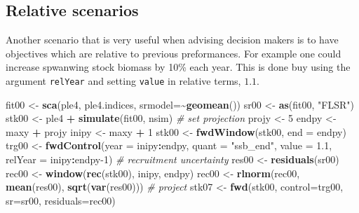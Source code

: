 \documentclass[
]{book}
\newenvironment{Shaded}{\begin{snugshade}}{\end{snugshade}}
\newcommand{\AttributeTok}[1]{\textcolor[rgb]{0.13,0.29,0.53}{#1}}
\newcommand{\CommentTok}[1]{\textcolor[rgb]{0.56,0.35,0.01}{\textit{#1}}}
\newcommand{\DecValTok}[1]{\textcolor[rgb]{0.00,0.00,0.81}{#1}}
\newcommand{\FloatTok}[1]{\textcolor[rgb]{0.00,0.00,0.81}{#1}}
\newcommand{\FunctionTok}[1]{\textcolor[rgb]{0.13,0.29,0.53}{\textbf{#1}}}
\newcommand{\NormalTok}[1]{#1}
\newcommand{\OtherTok}[1]{\textcolor[rgb]{0.56,0.35,0.01}{#1}}
\newcommand{\SpecialCharTok}[1]{\textcolor[rgb]{0.81,0.36,0.00}{\textbf{#1}}}
\newcommand{\StringTok}[1]{\textcolor[rgb]{0.31,0.60,0.02}{#1}}
\begin{document}
\hypertarget{relative-scenarios}{%
\subsection{Relative scenarios}\label{relative-scenarios}}

Another scenario that is very useful when advising decision makers is to have objectives which are relative to previous preformances. For example one could increase spwanwing stock biomass by 10\% each year. This is done buy using the argument \texttt{relYear} and setting \texttt{value} in relative terms, \(1.1\).

\begin{Shaded}
\begin{Highlighting}[]
\NormalTok{fit00 }\OtherTok{\textless{}{-}} \FunctionTok{sca}\NormalTok{(ple4, ple4.indices, }\AttributeTok{srmodel=}\SpecialCharTok{\textasciitilde{}}\FunctionTok{geomean}\NormalTok{())}
\NormalTok{sr00 }\OtherTok{\textless{}{-}} \FunctionTok{as}\NormalTok{(fit00, }\StringTok{"FLSR"}\NormalTok{)}
\NormalTok{stk00 }\OtherTok{\textless{}{-}}\NormalTok{ ple4 }\SpecialCharTok{+} \FunctionTok{simulate}\NormalTok{(fit00, nsim)}
\CommentTok{\# set projection}
\NormalTok{projy }\OtherTok{\textless{}{-}} \DecValTok{5}
\NormalTok{endpy }\OtherTok{\textless{}{-}}\NormalTok{ maxy }\SpecialCharTok{+}\NormalTok{ projy}
\NormalTok{inipy }\OtherTok{\textless{}{-}}\NormalTok{ maxy }\SpecialCharTok{+} \DecValTok{1}
\NormalTok{stk00 }\OtherTok{\textless{}{-}} \FunctionTok{fwdWindow}\NormalTok{(stk00, }\AttributeTok{end =}\NormalTok{ endpy)}
\NormalTok{trg00 }\OtherTok{\textless{}{-}} \FunctionTok{fwdControl}\NormalTok{(}\AttributeTok{year =}\NormalTok{ inipy}\SpecialCharTok{:}\NormalTok{endpy, }\AttributeTok{quant =} \StringTok{"ssb\_end"}\NormalTok{, }\AttributeTok{value =} \FloatTok{1.1}\NormalTok{, }\AttributeTok{relYear =}\NormalTok{ inipy}\SpecialCharTok{:}\NormalTok{endpy}\DecValTok{{-}1}\NormalTok{)}
\CommentTok{\# recruitment uncertainty}
\NormalTok{res00 }\OtherTok{\textless{}{-}} \FunctionTok{residuals}\NormalTok{(sr00)}
\NormalTok{rec00 }\OtherTok{\textless{}{-}} \FunctionTok{window}\NormalTok{(}\FunctionTok{rec}\NormalTok{(stk00), inipy, endpy)}
\NormalTok{rec00 }\OtherTok{\textless{}{-}} \FunctionTok{rlnorm}\NormalTok{(rec00, }\FunctionTok{mean}\NormalTok{(res00), }\FunctionTok{sqrt}\NormalTok{(}\FunctionTok{var}\NormalTok{(res00)))}
\CommentTok{\# project}
\NormalTok{stk07 }\OtherTok{\textless{}{-}} \FunctionTok{fwd}\NormalTok{(stk00, }\AttributeTok{control=}\NormalTok{trg00, }\AttributeTok{sr=}\NormalTok{sr00, }\AttributeTok{residuals=}\NormalTok{rec00)}
\end{Highlighting}
\end{Shaded}
\end{document}
